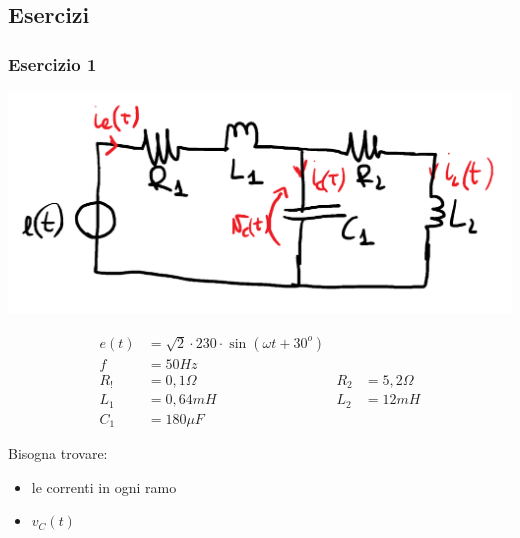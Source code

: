 \documentclass{article}
\begin{document}
\subsection{Esercizi}
\subsubsection{Esercizio 1}
\begin{center}
    \includegraphics[scale=0.26]{Image/Es_Regime_Sinusoiudale_1.png}
\end{center}
\begin{align*}
    e(t) &= \sqrt{2} \cdot 230 \cdot \sin(\omega t + 30^o)\\
    f &= 50 Hz\\
    R_! &= 0,1 \Omega & R_2&=5,2 \Omega\\
    L_1 &= 0,64 mH & L_2 &= 12 mH\\
    C_1 &= 180 \mu F
\end{align*}

Bisogna trovare:
\begin{itemize}
    \item le correnti in ogni ramo
    \item $v_C(t)$
\end{itemize}
\end{document}
